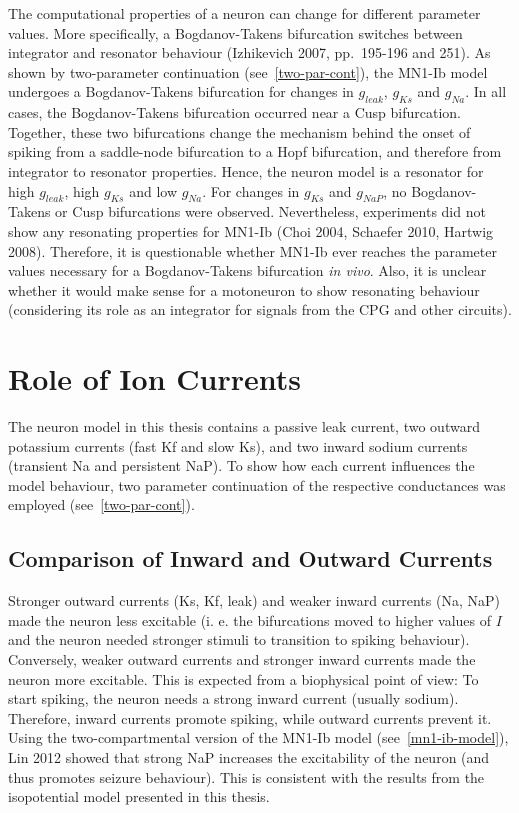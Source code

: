 \documentclass[12pt,a4paper,]{report}
\begin{document}
The computational properties of a neuron can change for different
parameter values. More specifically, a Bogdanov-Takens bifurcation
switches between integrator and resonator behaviour (Izhikevich 2007,
pp.~195-196 and 251). As shown by two-parameter continuation
(see~\ref{two-par-cont}), the MN1-Ib model undergoes a Bogdanov-Takens
bifurcation for changes in $g_{leak}$, $g_{Ks}$ and $g_{Na}$. In all cases, the
Bogdanov-Takens bifurcation occurred near a Cusp bifurcation. Together,
these two bifurcations change the mechanism behind the onset of spiking
from a saddle-node bifurcation to a Hopf bifurcation, and therefore from
integrator to resonator properties. Hence, the neuron model is a
resonator for high $g_{leak}$, high $g_{Ks}$ and low $g_{Na}$. For changes in $g_{Ks}$ and
$g_{NaP}$, no Bogdanov-Takens or Cusp bifurcations were observed.
Nevertheless, experiments did not show any resonating properties for
MN1-Ib (Choi 2004, Schaefer 2010, Hartwig 2008). Therefore, it is
questionable whether MN1-Ib ever reaches the parameter values necessary
for a Bogdanov-Takens bifurcation \emph{in vivo}. Also, it is unclear
whether it would make sense for a motoneuron to show resonating
behaviour (considering its role as an integrator for signals from the
CPG and other circuits).

\section{Role of Ion Currents}\label{role-of-ion-currents}

The neuron model in this thesis contains a passive leak current, two
outward potassium currents (fast Kf and slow Ks), and two inward sodium
currents (transient Na and persistent NaP). To show how each current
influences the model behaviour, two parameter continuation of the
respective conductances was employed (see~\ref{two-par-cont}).

\subsection{Comparison of Inward and Outward
Currents}\label{comparison-of-inward-and-outward-currents}

Stronger outward currents (Ks, Kf, leak) and weaker inward currents (Na,
NaP) made the neuron less excitable (i. e. the bifurcations moved to
higher values of $I$ and the neuron needed stronger stimuli to
transition to spiking behaviour). Conversely, weaker outward currents
and stronger inward currents made the neuron more excitable. This is
expected from a biophysical point of view: To start spiking, the neuron
needs a strong inward current (usually sodium). Therefore, inward
currents promote spiking, while outward currents prevent it. Using the
two-compartmental version of the MN1-Ib model (see~\ref{mn1-ib-model}),
Lin 2012 showed that strong NaP increases the excitability of the neuron
(and thus promotes seizure behaviour). This is consistent with the
results from the isopotential model presented in this thesis.
\end{document}

